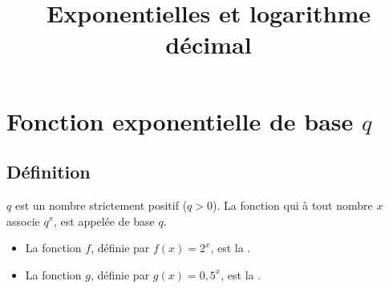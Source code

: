 \documentclass[xcolor={dvipsnames}]{beamer}
\title{Exponentielles et logarithme décimal}
\author{}\institute{}
\begin{document}
\begin{frame}
  \titlepage 
\end{frame}

\section{Fonction exponentielle de base $q$}

\subsection{Définition}



\begin{frame}
\begin{mydef}
	$q$ est un nombre strictement positif ($q > 0$).
	La fonction qui à tout nombre $x$ associe $q^x$, est appelée  de base $q$.
\end{mydef}\pause

\begin{myex}
	\begin{itemize}
		\item La fonction $f$, définie par $f(x)=2^x$, est la . 
		\item La fonction $g$, définie par $g(x)=0,5^x$, est la .
	\end{itemize}
	
\end{myex}

\end{frame}
\end{document}
